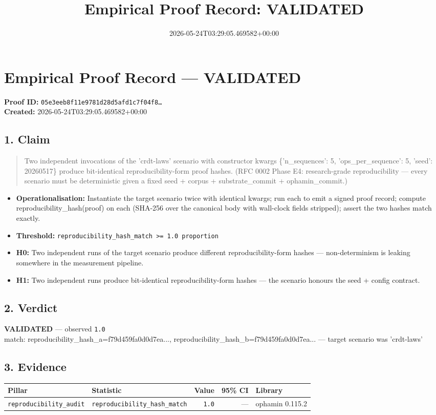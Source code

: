 \documentclass{article}
\title{Empirical Proof Record: VALIDATED}
\date{2026-05-24T03:29:05.469582+00:00}
\begin{document}
\maketitle
\section*{Empirical Proof Record --- \textcolor{validated}{\textbf{VALIDATED}}}
\textbf{Proof ID:} \texttt{05e3eeb8f11e9781d28d5afd1c7f04f8\dots}\\
\textbf{Created:} 2026-05-24T03:29:05.469582+00:00
\subsection*{1. Claim}
\begin{quote}Two independent invocations of the 'crdt-laws' scenario with constructor kwargs \{'n\_sequences': 5, 'ops\_per\_sequence': 5, 'seed': 20260517\} produce bit-identical reproducibility-form proof hashes. (RFC 0002 Phase E4: research-grade reproducibility — every scenario must be deterministic given a fixed seed + corpus + substrate\_commit + ophamin\_commit.)\end{quote}
\begin{itemize}
\item \textbf{Operationalisation:} Instantiate the target scenario twice with identical kwargs; run each to emit a signed proof record; compute reproducibility\_hash(proof) on each (SHA-256 over the canonical body with wall-clock fields stripped); assert the two hashes match exactly.
\item \textbf{Threshold:} \texttt{reproducibility\_hash\_match >= 1.0 proportion}
\item \textbf{H0:} Two independent runs of the target scenario produce different reproducibility-form hashes — non-determinism is leaking somewhere in the measurement pipeline.
\item \textbf{H1:} Two independent runs produce bit-identical reproducibility-form hashes — the scenario honours the seed + config contract.
\end{itemize}
\subsection*{2. Verdict}
\textcolor{validated}{\textbf{VALIDATED}} --- observed \texttt{1.0}\\
match: reproducibility\_hash\_a=f79d459fa0d0d7ea..., reproducibility\_hash\_b=f79d459fa0d0d7ea... — target scenario was 'crdt-laws'
\subsection*{3. Evidence}
\begin{tabular}{llrrl}\toprule
\textbf{Pillar} & \textbf{Statistic} & \textbf{Value} & \textbf{95\% CI} & \textbf{Library} \\\midrule
\texttt{reproducibility\_audit} & \texttt{reproducibility\_hash\_match} & \texttt{1.0} & --- & ophamin 0.115.2 \\
\bottomrule\end{tabular}
\end{document}
